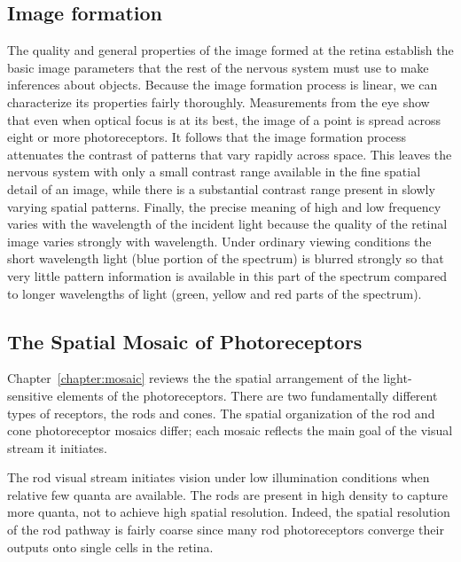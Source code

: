 \subsection*{Image formation}
The quality and general properties of the
image formed at the retina establish the basic
image parameters that the rest of the nervous system
must use to make inferences about objects.
Because the image formation process is linear,
we can characterize its properties fairly thoroughly.
Measurements from the eye
show that even when optical focus is at its best,
the image of a point is spread across 
eight or more photoreceptors.
It follows that the image formation process
attenuates the contrast of patterns that
vary rapidly across space.
This leaves the nervous system with only
a small contrast range available
in the fine spatial detail of an image,
while there is a substantial
contrast range present in slowly varying spatial patterns.
Finally, the precise meaning of high and low frequency
varies with the wavelength of the incident light
because the quality of the retinal image varies strongly
with wavelength.
Under ordinary viewing conditions
the short wavelength light (blue portion of the spectrum)
is blurred strongly so that very little pattern information
is available in this part of the spectrum compared to
longer wavelengths of light (green, yellow and red parts of the spectrum).

\subsection*{The Spatial Mosaic of Photoreceptors}
Chapter~\ref{chapter:mosaic} reviews the
the spatial arrangement of the light-sensitive elements of
the photoreceptors.
There are two fundamentally different types of receptors,
the rods and cones.
The spatial organization of the rod and cone photoreceptor
mosaics differ; each mosaic reflects
the main goal of the visual stream it initiates.

The rod visual stream initiates vision under low illumination
conditions when relative few quanta are available.
The rods are present in high density
to capture more quanta, not to achieve
high spatial resolution.
Indeed, the spatial resolution of the rod pathway is fairly coarse
since many rod photoreceptors converge their outputs onto
single cells in the retina.

